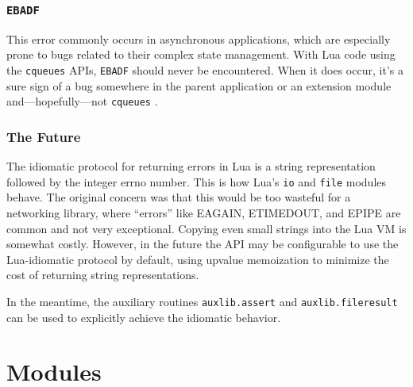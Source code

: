 \documentclass[11pt, oneside]{memoir}
\newcommand{\cqueues}[0]{\texttt{cqueues} }
\newcommand{\fn}[1]{\texttt{#1} }
\newcommand{\errno}[1]{\texttt{#1} }
\begin{document}
\subsubsection{\texttt{EBADF}}

This error commonly occurs in asynchronous applications, which are especially prone to bugs related to their complex state management. With Lua code using the \cqueues APIs, \errno{EBADF} should never be encountered. When it does occur, it's a sure sign of a bug somewhere in the parent application or an extension module and---hopefully---not \cqueues.

\subsubsection{The Future}

The idiomatic protocol for returning errors in Lua is a string representation followed by the integer errno number. This is how Lua's \fn{io} and \fn{file} modules behave. The original concern was that this would be too wasteful for a networking library, where ``errors'' like EAGAIN, ETIMEDOUT, and EPIPE are common and not very exceptional. Copying even small strings into the Lua VM is somewhat costly. However, in the future the API may be configurable to use the Lua-idiomatic protocol by default, using upvalue memoization to minimize the cost of returning string representations.

In the meantime, the auxiliary routines \fn{auxlib.assert} and \fn{auxlib.fileresult} can be used to explicitly achieve the idiomatic behavior.

\section{Modules}
\end{document}
